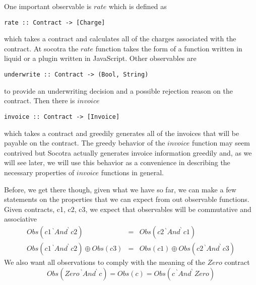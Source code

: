 One important observable is $rate$ which is defined as
\begin{lstlisting}
rate :: Contract -> [Charge]
\end{lstlisting}
which takes a contract and calculates all of the charges associated with the contract. At socotra the $rate$
function takes the form of a function written in liquid or a plugin written in JavaScript. Other observables
are
\begin{lstlisting}
underwrite :: Contract -> (Bool, String)
\end{lstlisting}
to provide an underwriting decision and a possible rejection reason on the contract. Then there is $invoice$
\begin{lstlisting}
invoice :: Contract -> [Invoice]
\end{lstlisting}
which takes a contract and greedily generates all of the invoices that will be payable on the contract. The
greedy behavior of the $invoice$ function may seem contrived but Socotra actually generates invoice information
greedily and, as we will see later, we will use this behavior as a convenience in describing the necessary properties
of $invoice$ functions in general.

Before, we get there though, given what we have so far, we can make a few statements on the properties that we can
expect from out observable functions. Given contracts, c1, c2, c3, we expect that observables will be commutative and associative
\begin{eqnarray*}
Obs(c1 \, { ^\backprime}An{d^\backprime} \, c2) &  = & Obs(c2 \, { ^\backprime}An{d^\backprime} \, c1) \\
Obs(c1 \, { ^\backprime}An{d^\backprime} \, c2) \oplus Obs(c3) & = & Obs(c1) \oplus Obs(c2 \, { ^\backprime}An{d^\backprime} \, c3)
\end{eqnarray*}
We also want all observations to comply with the meaning of the $Zero$ contract
\begin{equation*}
Obs(Zero \, { ^\backprime}An{d^\backprime} \, c) = Obs(c) = Obs(c \, { ^\backprime}An{d^\backprime} \, Zero)
\end{equation*}


